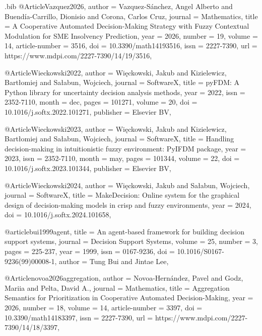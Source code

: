 \begin{filecontents*}[overwrite]{\jobname.bib}
@Article{Vazquez2026,
  author        = {Vazquez-S{\'{a}}nchez, Angel Alberto and Buend{\'{i}}a-Carrillo, Dionisio and Corona, Carlos Cruz},
  journal       = {Mathematics},
  title         = {A Cooperative Automated Decision-Making Strategy with Fuzzy Contextual Modulation for {SME} Insolvency Prediction},
  year          = {2026},
  number        = {19},
  volume        = {14},
  article-number = {3516},
  doi           = {10.3390/math14193516},
  issn          = {2227-7390},
  url           = {https://www.mdpi.com/2227-7390/14/19/3516},
}

@Article{Wieckowski2022,
  author    = {Wi{\k{e}}ckowski, Jakub and Kizielewicz, Bart{\l}omiej and Sa{\l}abun, Wojciech},
  journal   = {SoftwareX},
  title     = {{pyFDM}: A {Python} library for uncertainty decision analysis methods},
  year      = {2022},
  issn      = {2352-7110},
  month     = dec,
  pages     = {101271},
  volume    = {20},
  doi       = {10.1016/j.softx.2022.101271},
  publisher = {Elsevier BV},
}

@Article{Wieckowski2023,
  author    = {Wi{\k{e}}ckowski, Jakub and Kizielewicz, Bart{\l}omiej and Sa{\l}abun, Wojciech},
  journal   = {SoftwareX},
  title     = {Handling decision-making in intuitionistic fuzzy environment: {PyIFDM} package},
  year      = {2023},
  issn      = {2352-7110},
  month     = may,
  pages     = {101344},
  volume    = {22},
  doi       = {10.1016/j.softx.2023.101344},
  publisher = {Elsevier BV},
}

@Article{Wieckowski2024,
  author  = {Wi{\k{e}}ckowski, Jakub and Sa{\l}abun, Wojciech},
  journal = {SoftwareX},
  title   = {{MakeDecision}: Online system for the graphical design of decision-making models in crisp and fuzzy environments},
  year    = {2024},
  doi     = {10.1016/j.softx.2024.101658},
}

@article{bui1999agent,
title = {An agent-based framework for building decision support systems},
journal = {Decision Support Systems},
volume = {25},
number = {3},
pages = {225-237},
year = {1999},
issn = {0167-9236},
doi = {10.1016/S0167-9236(99)00008-1},
author = {Tung Bui and Jintae Lee},
}

@Article{novoa2026aggregation,
  author        = {Novoa-Hern{\'{a}}ndez, Pavel and Godz, Mariia and Pelta, David A.},
  journal       = {Mathematics},
  title         = {Aggregation Semantics for Prioritization in Cooperative Automated Decision-Making},
  year          = {2026},
  number        = {18},
  volume        = {14},
  article-number = {3397},
  doi           = {10.3390/math14183397},
  issn          = {2227-7390},
  url           = {https://www.mdpi.com/2227-7390/14/18/3397},
}
\end{filecontents*}

